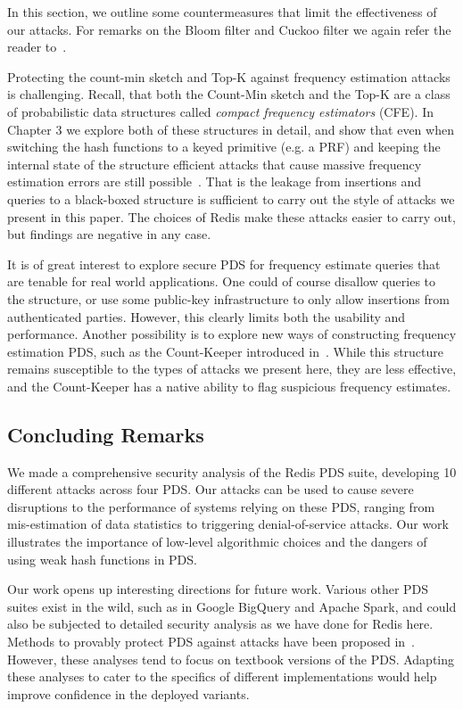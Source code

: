 In this section, we outline some countermeasures that limit the effectiveness of our attacks. For remarks on the Bloom filter and Cuckoo filter we again refer the reader to~\cite{cryptoeprint:2024/1312}.

Protecting the count-min sketch and Top-K against frequency estimation attacks is challenging. Recall, that both the Count-Min sketch and the Top-K are a class of probabilistic data structures called \emph{compact frequency estimators} (CFE). In Chapter 3 we explore both of these structures in detail, and show that even when switching the hash functions to a keyed primitive (e.g. a PRF) and keeping the internal state of the structure efficient attacks that cause massive frequency estimation errors are still possible~\cite{markelon23}. That is the leakage from insertions and queries to a black-boxed structure is sufficient to carry out the style of attacks we present in this paper. The choices of Redis make these attacks easier to carry out, but findings are negative in any case. 

It is of great interest to explore secure PDS for frequency estimate queries that are tenable for real world applications. One could of course disallow queries to the structure, or use some public-key infrastructure to only allow insertions from authenticated parties. However, this clearly limits both the usability and performance. Another possibility is to explore new ways of constructing frequency estimation PDS, such as the Count-Keeper introduced in~\cite{markelon23}. While this structure remains susceptible to the types of attacks we present here, they are less effective, and the Count-Keeper has a native ability to flag suspicious frequency estimates. 

\subsection{Concluding Remarks}

We made a comprehensive security analysis of the Redis PDS suite, developing 10 different attacks across four PDS. 
Our attacks can be used to cause severe disruptions to the performance of systems relying on these PDS, ranging from mis-estimation of data statistics to triggering denial-of-service attacks. 
Our work illustrates the importance of low-level algorithmic choices and the dangers of using weak hash functions in PDS. 

Our work opens up interesting directions for future work. Various other PDS suites exist in the wild, such as in Google BigQuery and Apache Spark, and could also be subjected to detailed security analysis as we have done for Redis here. 
Methods to provably protect PDS against attacks have been proposed in~\cite{NaorY15,clayton2019,FPUV22,PatersonR22}. However, these analyses tend to focus on textbook versions of the PDS. 
Adapting these analyses to cater to the specifics of different implementations would help improve confidence in the deployed variants.

